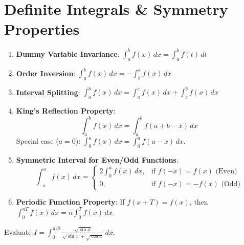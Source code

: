 \section{Definite Integrals \& Symmetry Properties}

\begin{theorem}
\begin{enumerate}[leftmargin=1.5em]
    \item \textbf{Dummy Variable Invariance}: $\int_a^b f(x)\,dx = \int_a^b f(t)\,dt$
    \item \textbf{Order Inversion}: $\int_a^b f(x)\,dx = -\int_b^a f(x)\,dx$
    \item \textbf{Interval Splitting}: $\int_a^b f(x)\,dx = \int_a^c f(x)\,dx + \int_c^b f(x)\,dx$
    \item \textbf{King's Reflection Property}:
    \begin{equation}
    \int_a^b f(x)\,dx = \int_a^b f(a + b - x)\,dx
    \end{equation}
    Special case ($a = 0$): $\int_0^a f(x)\,dx = \int_0^a f(a - x)\,dx$.
    \item \textbf{Symmetric Interval for Even/Odd Functions}:
    \begin{equation}
    \int_{-a}^a f(x)\,dx = \begin{cases}
    2 \int_0^a f(x)\,dx, & \text{if } f(-x) = f(x) \text{ (Even)} \\
    0, & \text{if } f(-x) = -f(x) \text{ (Odd)}
    \end{cases}
    \end{equation}
    \item \textbf{Periodic Function Property}: If $f(x+T) = f(x)$, then $\int_0^{nT} f(x)\,dx = n \int_0^T f(x)\,dx$.
\end{enumerate}
\end{theorem}

\begin{example}
Evaluate $I = \int_0^{\pi/2} \frac{\sqrt{\sin x}}{\sqrt{\sin x} + \sqrt{\cos x}}\,dx$.
\end{example}

